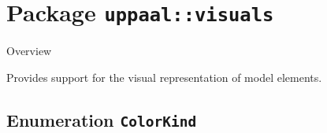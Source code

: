 			\newpage
		\section{Package \bfseries \texttt{uppaal::visuals}\normalfont}
		
		\begin{longdescription}
		\item[Overview]			
				

	

		Provides support for the visual representation of model elements.		
		\end{longdescription}
	

\subsection{Enumeration \bfseries \texttt{ColorKind}\normalfont}
\label{cls:uppaal::visuals::ColorKind} 

